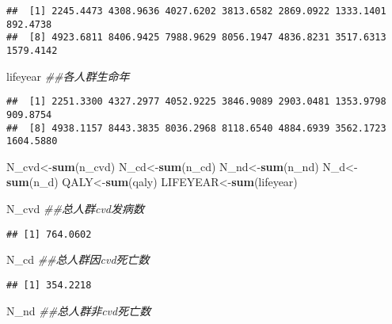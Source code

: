 \documentclass[
]{article}
\newenvironment{Shaded}{\begin{snugshade}}{\end{snugshade}}
\newcommand{\CommentTok}[1]{\textcolor[rgb]{0.56,0.35,0.01}{\textit{#1}}}
\newcommand{\KeywordTok}[1]{\textcolor[rgb]{0.13,0.29,0.53}{\textbf{#1}}}
\newcommand{\NormalTok}[1]{#1}
\begin{document}
\begin{verbatim}
##  [1] 2245.4473 4308.9636 4027.6202 3813.6582 2869.0922 1333.1401  892.4738
##  [8] 4923.6811 8406.9425 7988.9629 8056.1947 4836.8231 3517.6313 1579.4142
\end{verbatim}

\begin{Shaded}
\begin{Highlighting}[]
\NormalTok{lifeyear }\CommentTok{##各人群生命年}
\end{Highlighting}
\end{Shaded}

\begin{verbatim}
##  [1] 2251.3300 4327.2977 4052.9225 3846.9089 2903.0481 1353.9798  909.8754
##  [8] 4938.1157 8443.3835 8036.2968 8118.6540 4884.6939 3562.1723 1604.5880
\end{verbatim}

\begin{Shaded}
\begin{Highlighting}[]
\NormalTok{N_cvd<-}\KeywordTok{sum}\NormalTok{(n_cvd)}
\NormalTok{N_cd<-}\KeywordTok{sum}\NormalTok{(n_cd)}
\NormalTok{N_nd<-}\KeywordTok{sum}\NormalTok{(n_nd)}
\NormalTok{N_d<-}\KeywordTok{sum}\NormalTok{(n_d)}
\NormalTok{QALY<-}\KeywordTok{sum}\NormalTok{(qaly)}
\NormalTok{LIFEYEAR<-}\KeywordTok{sum}\NormalTok{(lifeyear)}

\NormalTok{N_cvd }\CommentTok{##总人群cvd发病数}
\end{Highlighting}
\end{Shaded}

\begin{verbatim}
## [1] 764.0602
\end{verbatim}

\begin{Shaded}
\begin{Highlighting}[]
\NormalTok{N_cd }\CommentTok{##总人群因cvd死亡数}
\end{Highlighting}
\end{Shaded}

\begin{verbatim}
## [1] 354.2218
\end{verbatim}

\begin{Shaded}
\begin{Highlighting}[]
\NormalTok{N_nd }\CommentTok{##总人群非cvd死亡数}
\end{Highlighting}
\end{Shaded}
\end{document}
